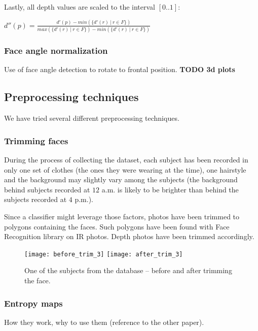         Lastly, all depth values are scaled to the interval $[0..1]$:
        \begin{center}
        $
          d''(p) = \frac{d'(p) - min(\{d'(r)\ |\ r \in F\})}{max(\{d'(r)\ |\ r \in F\}) - min(\{d'(r)\ |\ r \in F\})}
        $
        \end{center}

        \subsubsection*{Face angle normalization}
        Use of face angle detection to rotate to frontal position.
        \textbf{TODO 3d plots}

    \subsection{Preprocessing techniques}
    We have tried several different preprocessing techniques.
        \subsubsection*{Trimming faces}
        During the process of collecting the dataset, each subject has been
        recorded in only one set of clothes (the ones they were wearing at the
        time), one hairstyle and the background may slightly vary among the
        subjects (the background behind subjects recorded at $12$ a.m. is
        likely to be brighter than behind the subjects recorded at $4$ p.m.).

        Since a classifier might leverage those factors, photos have been
        trimmed to polygons containing the faces. Such polygons have been
        found with Face Recognition library \cite{facerecog} on IR photos.
        Depth photos have been trimmed accordingly.

        \begin{figure}[H]
        \caption{One of the subjects from the database -- before and after trimming the face.}
        \centering
        \texttt{[image: before\_trim\_3]}
        \texttt{[image: after\_trim\_3]}
        \end{figure}

        \subsubsection*{Entropy maps}
        How they work, why to use them (reference to the other paper).

